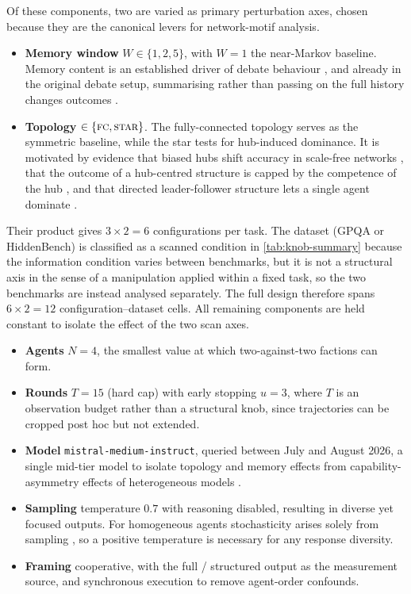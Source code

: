 Of these components, two are varied as primary perturbation axes, chosen because they
are the canonical levers for network-motif analysis.
\begin{itemize}
  \item \textbf{Memory window} $W \in \{1, 2, 5\}$, with $W = 1$ the near-Markov
        baseline. Memory content is an established driver of debate behaviour
        \citep{mehdizadeh2026topologymemory, marandi2026protocols}, and already in
        the original debate setup, summarising rather than passing on the full
        history changes outcomes \citep{du2024improving}.
  \item \textbf{Topology} $\in \{\textsc{fc}, \textsc{star}\}$. The fully-connected topology
        serves as the symmetric baseline, while the star tests for hub-induced dominance.
        It is motivated by evidence that biased hubs shift accuracy in scale-free
        networks \citep{liu2025problemsolving}, that the outcome of a hub-centred
        structure is capped by the competence of the hub \citep{conformitydynamics2026},
        and that directed leader-follower structure lets a single agent dominate
        \citep{chen2023consensus}.
\end{itemize}
Their product gives $3 \times 2 = 6$ configurations per task. The dataset (GPQA
or HiddenBench) is classified as a scanned condition in \autoref{tab:knob-summary}
because the information condition varies between benchmarks, but it is not a
structural axis in the sense of a manipulation applied within a fixed task, so the
two benchmarks are instead analysed separately. The full design
therefore spans $6 \times 2 = 12$ configuration--dataset cells.
All remaining components are held constant to isolate the effect of the two scan
axes.
\begin{itemize}
  \item \textbf{Agents} $N = 4$, the smallest value at which
        two-against-two factions can form.
  \item \textbf{Rounds} $T = 15$ (hard cap) with early stopping $u = 3$, where $T$ is
        an observation budget rather than a structural knob, since trajectories
        can be cropped post hoc but not extended.
  \item \textbf{Model} \texttt{mistral-medium-instruct}, queried between July and August 2026, a single mid-tier
        model to isolate topology and memory effects from capability-asymmetry
        effects of heterogeneous models \citep{wynn2025talk}.
  \item \textbf{Sampling} temperature $0.7$ with reasoning disabled, resulting in diverse yet
        focused outputs. For homogeneous agents stochasticity arises solely from
        sampling \citep{zhu2026demystifying}, so a positive temperature is necessary
        for any response diversity.
  \item \textbf{Framing} cooperative, with the full \arguephase{}/\updatephase{} structured
        output as the measurement source, and synchronous execution to
        remove agent-order confounds.
\end{itemize}

